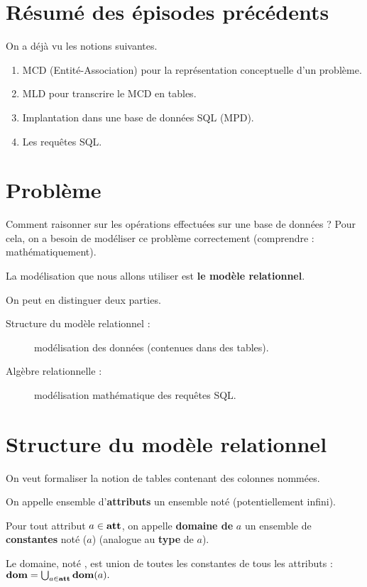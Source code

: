 \section{Résumé des épisodes précédents}

On a déjà vu les notions suivantes.
\begin{enumerate}
\item MCD (Entité-Association) pour la représentation conceptuelle d'un problème.
\item MLD pour transcrire le MCD en tables.
\item Implantation dans une base de données SQL (MPD).
\item Les requêtes SQL.
\end{enumerate}


\section{Problème}

Comment raisonner sur les opérations effectuées sur une base de
données ? Pour cela, on a besoin de  modéliser  ce problème correctement
(comprendre : mathématiquement).

La modélisation que nous allons utiliser est \textbf{le modèle relationnel}.

On peut en distinguer deux parties.
\begin{description}
\item[Structure du modèle relationnel :] modélisation des données (contenues dans des tables).
\item[Algèbre relationnelle :] modélisation mathématique des requêtes SQL.
\end{description}

\section{Structure du modèle relationnel}

On veut formaliser la notion de tables contenant des colonnes nommées.

\begin{defi}
  On appelle  ensemble d'\textbf{attributs} un ensemble noté \att{} (potentiellement infini).

  Pour tout attribut $a\in\mathbf{att}$, on appelle \textbf{domaine de }$a$ un ensemble de
  \textbf{constantes} noté \dom($a$) (analogue au \textbf{type} de $a$).

  Le domaine, noté \dom{}, est union de toutes les constantes de tous les attributs : $
    \mathbf{dom} = \bigcup_{a \in \mathbf{att}} \mathbf{dom}(a).
$
\end{defi}

